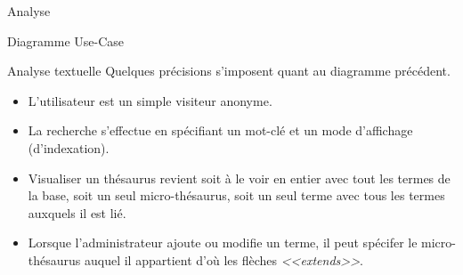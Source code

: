 \documentclass[a4paper, 12pt]{report}
\begin{document}
\begin{chapter}{Analyse}
\begin{section}{Diagramme Use-Case}
		\begin{subsection}{Analyse textuelle}
			Quelques précisions s'imposent quant au diagramme précédent.\\
			\begin{itemize}
				\item L'utilisateur est un simple visiteur anonyme.
				\item La recherche s'effectue en spécifiant un mot-clé et un mode d'affichage (d'indexation).
				\item Visualiser un thésaurus revient soit à le voir en entier avec tout les termes de la base,
					soit un seul micro-thésaurus, soit un seul terme avec tous les termes auxquels il est lié.
				\item Lorsque l'administrateur ajoute ou modifie un terme, il peut spécifer le micro-thésaurus auquel il appartient d'où les flèches \emph{<<extends>>}.
			\end{itemize}
		\end{subsection}
	\end{section}
\end{chapter}
\end{document}
